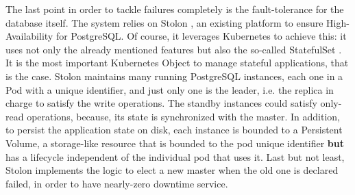 \documentclass[12pt,twoside,cucitura]{toptesi}
\begin{document}
The last point in order to tackle failures completely is the fault-tolerance for the database itself. The system relies on Stolon \cite{stolon}, an existing platform to ensure High-Availability for PostgreSQL. Of course, it leverages Kubernetes to achieve this: it uses not only the already mentioned features but also the so-called StatefulSet \cite{kube_statefulset}. It is the most important Kubernetes Object to manage stateful applications, that is the case. Stolon maintains many running PostgreSQL instances, each one in a Pod with a unique identifier, and just only one is the leader, i.e. the replica in charge to satisfy the write operations. The standby instances could satisfy only-read operations, because,  its state is synchronized with the master. In addition, to persist the application state on disk, each instance is bounded to a Persistent Volume, a storage-like resource that is bounded to the pod unique identifier \textbf{but} has a lifecycle independent of the individual pod that uses it. Last but not least, Stolon implements the logic to elect a new master when the old one is declared failed, in order to have nearly-zero downtime service.
\end{document}
